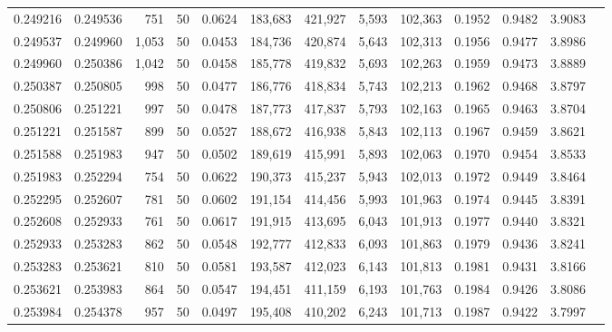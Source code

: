 \begin{tabular}{rrrrrrrrrrrrr}
0.249216 & 0.249536 &   751 &  50 &                                     0.0624 & 183,683 & 421,927 &   5,593 & 102,363 & 0.1952 & 0.9482 & 3.9083 \\
0.249537 & 0.249960 & 1,053 &  50 &                                     0.0453 & 184,736 & 420,874 &   5,643 & 102,313 & 0.1956 & 0.9477 & 3.8986 \\
0.249960 & 0.250386 & 1,042 &  50 &                                     0.0458 & 185,778 & 419,832 &   5,693 & 102,263 & 0.1959 & 0.9473 & 3.8889 \\
0.250387 & 0.250805 &   998 &  50 &                                     0.0477 & 186,776 & 418,834 &   5,743 & 102,213 & 0.1962 & 0.9468 & 3.8797 \\
0.250806 & 0.251221 &   997 &  50 &                                     0.0478 & 187,773 & 417,837 &   5,793 & 102,163 & 0.1965 & 0.9463 & 3.8704 \\
0.251221 & 0.251587 &   899 &  50 &                                     0.0527 & 188,672 & 416,938 &   5,843 & 102,113 & 0.1967 & 0.9459 & 3.8621 \\
0.251588 & 0.251983 &   947 &  50 &                                     0.0502 & 189,619 & 415,991 &   5,893 & 102,063 & 0.1970 & 0.9454 & 3.8533 \\
0.251983 & 0.252294 &   754 &  50 &                                     0.0622 & 190,373 & 415,237 &   5,943 & 102,013 & 0.1972 & 0.9449 & 3.8464 \\
0.252295 & 0.252607 &   781 &  50 &                                     0.0602 & 191,154 & 414,456 &   5,993 & 101,963 & 0.1974 & 0.9445 & 3.8391 \\
0.252608 & 0.252933 &   761 &  50 &                                     0.0617 & 191,915 & 413,695 &   6,043 & 101,913 & 0.1977 & 0.9440 & 3.8321 \\
0.252933 & 0.253283 &   862 &  50 &                                     0.0548 & 192,777 & 412,833 &   6,093 & 101,863 & 0.1979 & 0.9436 & 3.8241 \\
0.253283 & 0.253621 &   810 &  50 &                                     0.0581 & 193,587 & 412,023 &   6,143 & 101,813 & 0.1981 & 0.9431 & 3.8166 \\
0.253621 & 0.253983 &   864 &  50 &                                     0.0547 & 194,451 & 411,159 &   6,193 & 101,763 & 0.1984 & 0.9426 & 3.8086 \\
0.253984 & 0.254378 &   957 &  50 &                                     0.0497 & 195,408 & 410,202 &   6,243 & 101,713 & 0.1987 & 0.9422 & 3.7997 \\

\end{tabular}
